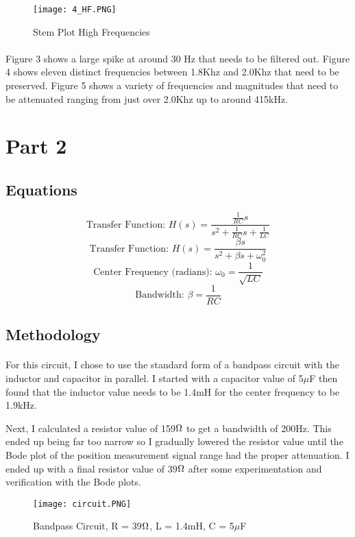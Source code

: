     \begin{figure}[H]
      \centering
      \texttt{[image: 4\_HF.PNG]}
     \caption{Stem Plot High Frequencies}
    \end{figure}

\paragraph{}
Figure 3 shows a large spike at around 30 Hz that needs to be filtered out.  Figure 4 shows eleven distinct frequencies between 1.8Khz and 2.0Khz that need to be preserved.  Figure 5 shows a variety of frequencies and magnitudes that need to be attenuated ranging from just over 2.0Khz up to around 415kHz.

\section{Part 2}
\subsection{Equations}

\[\text{Transfer Function: }H(s) = \frac{\frac{1}{RC}s}{s^{2}+\frac{1}{RC}s+\frac{1}{LC}}\]
\[\text{Transfer Function: }H(s) = \dfrac{\beta s}{s^{2}+\beta s+\omega_{0}^{2}}\]
\[\text{Center Frequency (radians): }\omega _{0} = \dfrac{1}{\sqrt{LC}}\]
\[\text{Bandwidth: } \beta = \dfrac{1}{RC}\]

\subsection{Methodology}
\paragraph{}
For this circuit, I chose to use the standard form of a bandpass circuit with the inductor and capacitor in parallel.  I started with a capacitor value of 5$\mu$F then found that the inductor value needs to be 1.4mH for the center frequency to be 1.9kHz.
\par 
Next, I calculated a resistor value of 159$\ohm$ to get a bandwidth of 200Hz.  This ended up being far too narrow so I gradually lowered the resistor value until the Bode plot of the position measurement signal range had the proper attenuation.  I ended up with a final resistor value of 39$\ohm$ after some experimentation and verification with the Bode plots.


 \begin{figure}[H]
   \centering
   \texttt{[image: circuit.PNG]}
   \caption{Bandpass Circuit, R = 39$\ohm$, L = 1.4mH, C = 5$\mu$F}
 \end{figure}

